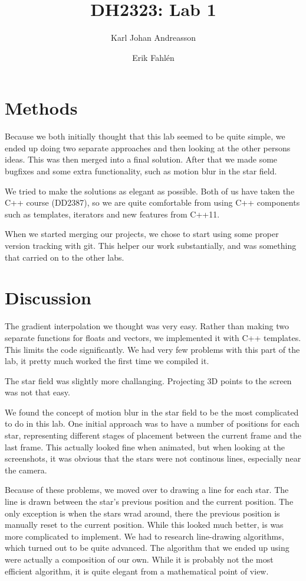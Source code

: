 \documentclass[a4paper]{article}
\begin{document}
\title{DH2323: Lab 1}
\author{Karl Johan Andreasson \and Erik Fahlén}

\maketitle
\clearpage

\section{Methods}
Because we both initially thought that this lab seemed to be quite simple, we ended up doing two separate approaches and then looking at the other persons ideas.
This was then merged into a final solution.
After that we made some bugfixes and some extra functionality, such as motion blur in the star field.

We tried to make the solutions as elegant as possible.
Both of us have taken the C++ course (DD2387), so we are quite comfortable from using C++ components such as templates, iterators and new features from C++11.

When we started merging our projects, we chose to start using some proper version tracking with git.
This helper our work substantially, and was something that carried on to the other labs.

\section{Discussion}
The gradient interpolation we thought was very easy.
Rather than making two separate functions for floats and vectors, we implemented it with C++ templates.
This limits the code significantly.
We had very few problems with this part of the lab, it pretty much worked the first time we compiled it.

The star field was slightly more challanging.
Projecting 3D points to the screen was not that easy.

We found the concept of motion blur in the star field to be the most complicated to do in this lab.
One initial approach was to have a number of positions for each star, representing different stages of placement between the current frame and the last frame.
This actually looked fine when animated, but when looking at the screenshots, it was obvious that the stars were not continous lines, especially near the camera.

Because of these problems, we moved over to drawing a line for each star.
The line is drawn between the star's previous position and the current position.
The only exception is when the stars wrad around, there the previous position is manually reset to the current position.
While this looked much better, is was more complicated to implement.
We had to research line-drawing algorithms, which turned out to be quite advanced.
The algorithm that we ended up using were actually a composition of our own.
While it is probably not the most efficient algorithm, it is quite elegant from a mathematical point of view.
\end{document}

